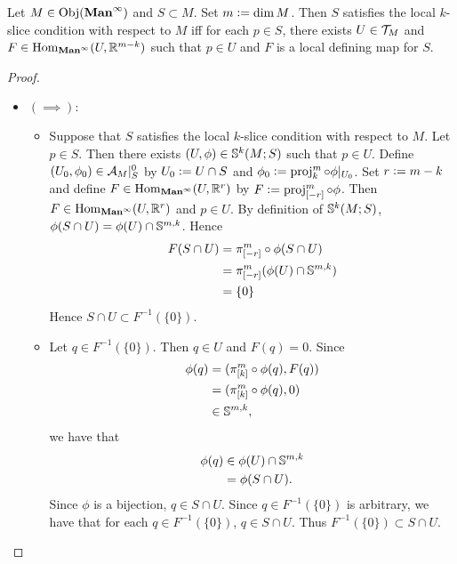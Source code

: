 \documentclass{book}
\begin{document}
	\begin{ex} 
		Let $M \in \Obj(\Maninf)$ and $S \subset M$. Set $m \defeq \dim M$. Then $S$ satisfies the local $k$-slice condition with respect to $M$ iff for each $p \in S$, there exists $U \in \MT_M$ and $F \in \Hom_{\Maninf}(U, \R^{m-k})$ such that $p \in U$ and $F$ is a local defining map for $S$.
	\end{ex}

	\begin{proof}\
		\begin{itemize}
			\item $(\implies):$ \\
			\begin{itemize}
				\item Suppose that $S$ satisfies the local $k$-slice condition with respect to $M$. Let $p \in S$. Then there exists $(U, \phi) \in \S^k(M; S)$ such that $p \in U$. Define $(U_0, \phi_0) \in \MA_M|_S^0$ by $U_0 \defeq U \cap S$ and $\phi_0 \defeq \prj^m_{k} \circ \phi|_{U_0}$. Set $r \defeq m - k$ and define $F \in \Hom_{\Maninf}(U, \R^r)$ by $F \defeq \prj^m_{[-r]} \circ \phi$. Then $F \in \Hom_{\Maninf}(U, \R^r)$ and $p \in U$. By definition of $\S^k(M; S)$, $\phi(S \cap U) = \phi(U) \cap \S^{m,k}$. Hence 
				\begin{align*}
					F(S \cap U)
					& = \pi^m_{[-r]} \circ \phi(S \cap U) \\
					& = \pi^m_{[-r]} (\phi(U) \cap \S^{m,k}) \\
					& = \{0\} 
				\end{align*}
				Hence $S \cap U \subset F^{-1}(\{0\})$. 
				\item Let $q \in F^{-1}(\{0\})$. Then $q \in U$ and $F(q) = 0$. Since 
				\begin{align*}
					\phi(q)
					& = (\pi^m_{[k]} \circ \phi(q), F(q)) \\
					& = (\pi^m_{[k]} \circ \phi(q), 0) \\
					& \in \S^{m,k},
				\end{align*}
				we have that 
				\begin{align*}
					\phi(q) 
					& \in \phi(U) \cap \S^{m,k} \\
					& = \phi(S \cap U).
				\end{align*}
				Since $\phi$ is a bijection, $q \in S \cap U$. Since $q \in F^{-1}(\{0\})$ is arbitrary, we have that for each $q \in F^{-1}(\{0\})$, $q \in S \cap U$. Thus $F^{-1}(\{0\}) \subset S \cap U$.  
			\end{itemize}

\end{itemize}
\end{proof}
\end{document}
